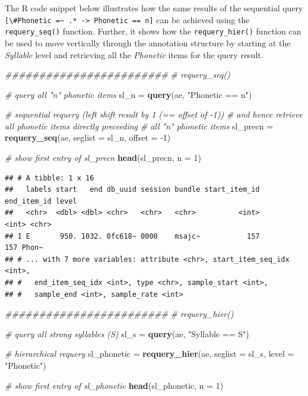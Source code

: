 \documentclass[]{book}
\newenvironment{Shaded}{\begin{snugshade}}{\end{snugshade}}
\newcommand{\CommentTok}[1]{\textcolor[rgb]{0.56,0.35,0.01}{\textit{#1}}}
\newcommand{\DataTypeTok}[1]{\textcolor[rgb]{0.13,0.29,0.53}{#1}}
\newcommand{\DecValTok}[1]{\textcolor[rgb]{0.00,0.00,0.81}{#1}}
\newcommand{\KeywordTok}[1]{\textcolor[rgb]{0.13,0.29,0.53}{\textbf{#1}}}
\newcommand{\NormalTok}[1]{#1}
\newcommand{\StringTok}[1]{\textcolor[rgb]{0.31,0.60,0.02}{#1}}
\begin{document}
The R code snippet below illustrates how the same results of the sequential query \texttt{{[}\textbackslash{}\#Phonetic\ =\textasciitilde{}\ .*\ -\textgreater{}\ Phonetic\ ==\ n{]}} can be achieved using the \texttt{requery\_seq()} function. Further, it shows how the \texttt{requery\_hier()} function can be used to move vertically through the annotation structure by starting at the \emph{Syllable} level and retrieving all the \emph{Phonetic} items for the query result.

\begin{Shaded}
\begin{Highlighting}[]
\CommentTok{########################}
\CommentTok{# requery_seq()}

\CommentTok{# query all "n" phonetic items}
\NormalTok{sl_n =}\StringTok{ }\KeywordTok{query}\NormalTok{(ae, }\StringTok{"Phonetic == n"}\NormalTok{)}

\CommentTok{# sequential requery (left shift result by 1 (== offset of -1))}
\CommentTok{# and hence retrieve all phonetic items directly preceeding}
\CommentTok{# all "n" phonetic items}
\NormalTok{sl_precn =}\StringTok{ }\KeywordTok{requery_seq}\NormalTok{(ae, }\DataTypeTok{seglist =}\NormalTok{ sl_n, }\DataTypeTok{offset =} \DecValTok{-1}\NormalTok{)}

\CommentTok{# show first entry of sl_precn}
\KeywordTok{head}\NormalTok{(sl_precn, }\DataTypeTok{n =} \DecValTok{1}\NormalTok{)}
\end{Highlighting}
\end{Shaded}

\begin{verbatim}
## # A tibble: 1 x 16
##   labels start   end db_uuid session bundle start_item_id end_item_id level
##   <chr>  <dbl> <dbl> <chr>   <chr>   <chr>          <int>       <int> <chr>
## 1 E       950. 1032. 0fc618~ 0000    msajc~           157         157 Phon~
## # ... with 7 more variables: attribute <chr>, start_item_seq_idx <int>,
## #   end_item_seq_idx <int>, type <chr>, sample_start <int>,
## #   sample_end <int>, sample_rate <int>
\end{verbatim}

\begin{Shaded}
\begin{Highlighting}[]
\CommentTok{########################}
\CommentTok{# requery_hier()}

\CommentTok{# query all strong syllables (S)}
\NormalTok{sl_s =}\StringTok{ }\KeywordTok{query}\NormalTok{(ae, }\StringTok{"Syllable == S"}\NormalTok{)}

\CommentTok{# hierarchical requery}
\NormalTok{sl_phonetic =}\StringTok{ }\KeywordTok{requery_hier}\NormalTok{(ae, }\DataTypeTok{seglist =}\NormalTok{ sl_s,}
                           \DataTypeTok{level =} \StringTok{"Phonetic"}\NormalTok{)}

\CommentTok{# show first entry of sl_phonetic}
\KeywordTok{head}\NormalTok{(sl_phonetic, }\DataTypeTok{n =} \DecValTok{1}\NormalTok{)}
\end{Highlighting}
\end{Shaded}
\end{document}
